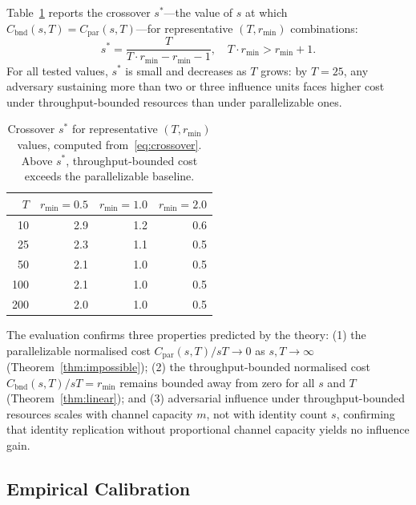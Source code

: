 \documentclass[10pt,journal,compsoc]{IEEEtran}
\theoremstyle{remark}
\begin{document}
	Table~\ref{tab:crossover} reports the crossover
	$s^*$---the value of $s$ at which
	$C_{\mathrm{bnd}}(s,T) = C_{\mathrm{par}}(s,T)$---for
	representative $(T, r_{\min})$ combinations:
	\begin{equation}
		s^* = \frac{T}{T \cdot r_{\min} - r_{\min} - 1},
		\quad T \cdot r_{\min} > r_{\min} + 1.
		\label{eq:crossover}
	\end{equation}
	For all tested values, $s^*$ is small and decreases
	as $T$ grows: by $T=25$, any adversary sustaining
	more than two or three influence units faces higher
	cost under throughput-bounded resources than under
	parallelizable ones.
	
	\begin{table}[t]
		\caption{Crossover $s^*$ for representative
			$(T, r_{\min})$ values, computed from~\eqref{eq:crossover}.
			Above $s^*$, throughput-bounded cost exceeds the
			parallelizable baseline.}
		\label{tab:crossover}
		\centering
		\renewcommand{\arraystretch}{1.2}
		\begin{tabular}{@{}rrrr@{}}
			\toprule
			$T$ & $r_{\min}=0.5$ & $r_{\min}=1.0$ & $r_{\min}=2.0$ \\
			\midrule
			10 & 2.9 & 1.2 & 0.6 \\
			25 & 2.3 & 1.1 & 0.5 \\
			50 & 2.1 & 1.0 & 0.5 \\
			100 & 2.1 & 1.0 & 0.5 \\
			200 & 2.0 & 1.0 & 0.5 \\
			\bottomrule
		\end{tabular}
	\end{table}
	
	The evaluation confirms three properties predicted
	by the theory:
	(1) the parallelizable normalised cost
	$C_{\mathrm{par}}(s,T)/sT \to 0$ as $s,T \to \infty$
	(Theorem~\ref{thm:impossible});
	(2) the throughput-bounded normalised cost
	$C_{\mathrm{bnd}}(s,T)/sT = r_{\min}$ remains bounded
	away from zero for all $s$ and $T$
	(Theorem~\ref{thm:linear});
	and (3) adversarial influence under throughput-bounded
	resources scales with channel capacity $m$, not with
	identity count $s$, confirming that identity
	replication without proportional channel capacity
	yields no influence gain.
	
	\subsection{Empirical Calibration}
	\label{ssec:eval_calibration}
	
\end{document}
